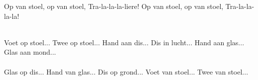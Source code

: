 \begin{verse*}
Op van stoel, op van stoel,
Tra-la-la-la-liere!
Op van stoel, op van stoel,
Tra-la-la-la-la!
\end{verse*}

\begin{verse*}
\\
Voet op stoel...
Twee op stoel...
Hand aan dis...
Dis in lucht...
Hand aan glas...
Glas aan mond...\\
\\
Glas op dis...
Hand van glas...
Dis op grond...
Voet van stoel...
Twee van stoel...
\end{verse*}
